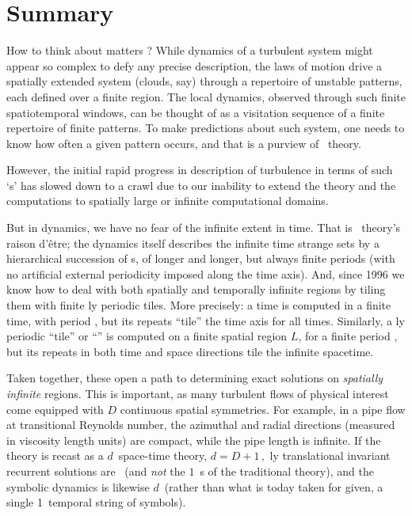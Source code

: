 

\section{Summary}
\label{s:summary}


How to think about matters {\spt}?
While dynamics of a turbulent system might appear so
complex to defy any precise description,
the laws of motion drive a spatially extended system (clouds, say) through a
repertoire of unstable patterns, each defined over a finite  {\spt}
region.
The local dynamics, observed through such
finite spatiotemporal windows, can be thought of as a visitation
sequence of a finite repertoire of finite patterns.
To make
predictions about such system,  one needs to know how often a given
pattern  occurs, and that is a purview of \po\ theory.

However, the initial rapid progress in description of turbulence in terms
of such `{\ecs}s' has slowed down to a crawl due
to our inability to extend the theory and the computations to
spatially large or infinite computational domains.

But in dynamics, we have no fear of the infinite extent in time. That is \po\
theory's raison d'\^{e}tre; the dynamics itself describes the
infinite time strange sets by a hierarchical succession of \po s, of longer
and longer, but always finite periods (with no artificial external
periodicity imposed along the time axis). And, since 1996 we know how to deal
with both spatially and temporally infinite regions by tiling them with
finite {\spt}ly periodic tiles\rf{Christiansen97,GHCW07}. More
precisely: a time {\po} is computed in a finite time, with period
\period{}, but its repeats ``tile'' the time axis for all times. Similarly, a
{\spt}ly periodic ``tile'' or ``\twot'' is computed on a finite
spatial region $L$, for a finite period \period{}, but its repeats in both
time and space directions tile the infinite spacetime.

Taken together, these open a path to determining exact solutions on
\emph{spatially infinite} regions.
This is important, as many turbulent flows of physical interest come equipped
with $D$ continuous spatial symmetries. For example, in a pipe flow at
transitional Reynolds number, the azimuthal and radial directions (measured
in viscosity length units) are compact, while the pipe length is infinite.
If the theory is recast as a $d$\dmn\ space-time theory,
\(d= D +1\,,\)
{\spt}ly translational invariant recurrent solutions are \dtors\
(and \emph{not} the $1$\dmn\ \po s of the traditional {\po} theory),
and the symbolic dynamics is likewise $d$\dmn\ (rather than what is
today taken for given, a single 1\dmn\ temporal string of symbols).

